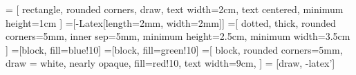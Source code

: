 \usepackage{lmodern}

\usepackage{multicol}

\usepackage{tabularx, longtable, booktabs}

\usepackage{multirow}

\usepackage{listings, listings-extended}

\usepackage[dvipsnames]{xcolor}

\usepackage{ifthen}

\usepackage{wrapfig,caption,subcaption}
\setlength\intextsep{5pt}

\usepackage{tikz}
\usetikzlibrary{arrows.meta,shapes,arrows,calc,positioning,fit}
 = [
rectangle,
rounded corners,
draw,
text width=2cm,
text centered,
minimum height=1cm
]
=[-{Latex[length=2mm, width=2mm]}]
=[
dotted,
thick,
rounded corners=5mm,
inner sep=5mm,
minimum height=2.5cm,
minimum width=3.5cm
]
=[block, fill=blue!10]
=[block, fill=green!10]
=[
block,
rounded corners=5mm,
draw = white,
nearly opaque,
fill=red!10,
text width=9cm,
]
 = [draw, -latex']


\usepackage{cleveref}
